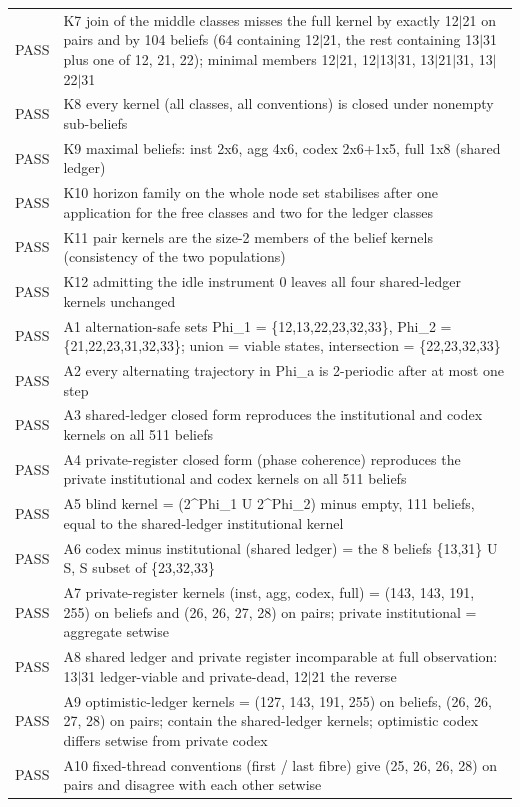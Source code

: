 \documentclass[11pt,a4paper]{article}
\theoremstyle{plain}
\theoremstyle{definition}
\theoremstyle{remark}
\begin{document}
\begin{longtable}{lp{}}
PASS & K7 join of the middle classes misses the full kernel by exactly 12$|$21 on pairs and by 104 beliefs (64 containing 12$|$21, the rest containing 13$|$31 plus one of 12, 21, 22); minimal members 12$|$21, 12$|$13$|$31, 13$|$21$|$31, 13$|$22$|$31 \\
PASS & K8 every kernel (all classes, all conventions) is closed under nonempty sub-beliefs \\
PASS & K9 maximal beliefs: inst 2x6, agg 4x6, codex 2x6+1x5, full 1x8 (shared ledger) \\
PASS & K10 horizon family on the whole node set stabilises after one application for the free classes and two for the ledger classes \\
PASS & K11 pair kernels are the size-2 members of the belief kernels (consistency of the two populations) \\
PASS & K12 admitting the idle instrument 0 leaves all four shared-ledger kernels unchanged \\
PASS & A1 alternation-safe sets Phi\_1 = \{12,13,22,23,32,33\}, Phi\_2 = \{21,22,23,31,32,33\}; union = viable states, intersection = \{22,23,32,33\} \\
PASS & A2 every alternating trajectory in Phi\_a is 2-periodic after at most one step \\
PASS & A3 shared-ledger closed form reproduces the institutional and codex kernels on all 511 beliefs \\
PASS & A4 private-register closed form (phase coherence) reproduces the private institutional and codex kernels on all 511 beliefs \\
PASS & A5 blind kernel = (2\^{}Phi\_1 U 2\^{}Phi\_2) minus empty, 111 beliefs, equal to the shared-ledger institutional kernel \\
PASS & A6 codex minus institutional (shared ledger) = the 8 beliefs \{13,31\} U S, S subset of \{23,32,33\} \\
PASS & A7 private-register kernels (inst, agg, codex, full) = (143, 143, 191, 255) on beliefs and (26, 26, 27, 28) on pairs; private institutional = aggregate setwise \\
PASS & A8 shared ledger and private register incomparable at full observation: 13$|$31 ledger-viable and private-dead, 12$|$21 the reverse \\
PASS & A9 optimistic-ledger kernels = (127, 143, 191, 255) on beliefs, (26, 26, 27, 28) on pairs; contain the shared-ledger kernels; optimistic codex differs setwise from private codex \\
PASS & A10 fixed-thread conventions (first / last fibre) give (25, 26, 26, 28) on pairs and disagree with each other setwise \\

\end{longtable}
\end{document}
